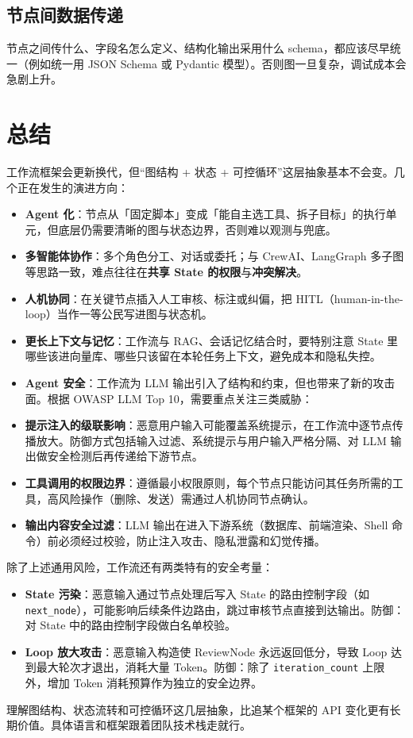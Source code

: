 \documentclass[9pt,a4paper,twocolumn]{ctexart}
\begin{document}
\subsection*{节点间数据传递}


节点之间传什么、字段名怎么定义、结构化输出采用什么 schema，都应该尽早统一（例如统一用 JSON Schema 或 Pydantic 模型）。否则图一旦复杂，调试成本会急剧上升。



\section*{总结}


工作流框架会更新换代，但“图结构 + 状态 + 可控循环”这层抽象基本不会变。几个正在发生的演进方向：


\begin{itemize}[itemsep=1pt, topsep=2pt]
  \item \textbf{Agent 化}：节点从「固定脚本」变成「能自主选工具、拆子目标」的执行单元，但底层仍需要清晰的图与状态边界，否则难以观测与兜底。
  \item \textbf{多智能体协作}：多个角色分工、对话或委托；与 CrewAI、LangGraph 多子图等思路一致，难点往往在\textbf{共享 State 的权限}与\textbf{冲突解决}。
  \item \textbf{人机协同}：在关键节点插入人工审核、标注或纠偏，把 HITL（human-in-the-loop）当作一等公民写进图与状态机。
  \item \textbf{更长上下文与记忆}：工作流与 RAG、会话记忆结合时，要特别注意 State 里哪些该进向量库、哪些只该留在本轮任务上下文，避免成本和隐私失控。
  \item \textbf{Agent 安全}：工作流为 LLM 输出引入了结构和约束，但也带来了新的攻击面。根据 OWASP LLM Top 10，需要重点关注三类威胁：
  \item \textbf{提示注入的级联影响}：恶意用户输入可能覆盖系统提示，在工作流中逐节点传播放大。防御方式包括输入过滤、系统提示与用户输入严格分隔、对 LLM 输出做安全检测后再传递给下游节点。
  \item \textbf{工具调用的权限边界}：遵循最小权限原则，每个节点只能访问其任务所需的工具，高风险操作（删除、发送）需通过人机协同节点确认。
  \item \textbf{输出内容安全过滤}：LLM 输出在进入下游系统（数据库、前端渲染、Shell 命令）前必须经过校验，防止注入攻击、隐私泄露和幻觉传播。
\end{itemize}


除了上述通用风险，工作流还有两类特有的安全考量：


\begin{itemize}[itemsep=1pt, topsep=2pt]
  \item \textbf{State 污染}：恶意输入通过节点处理后写入 State 的路由控制字段（如 \texttt{next\_node}），可能影响后续条件边路由，跳过审核节点直接到达输出。防御：对 State 中的路由控制字段做白名单校验。
  \item \textbf{Loop 放大攻击}：恶意输入构造使 ReviewNode 永远返回低分，导致 Loop 达到最大轮次才退出，消耗大量 Token。防御：除了 \texttt{iteration\_count} 上限外，增加 Token 消耗预算作为独立的安全边界。
\end{itemize}


理解图结构、状态流转和可控循环这几层抽象，比追某个框架的 API 变化更有长期价值。具体语言和框架跟着团队技术栈走就行。
\end{document}
